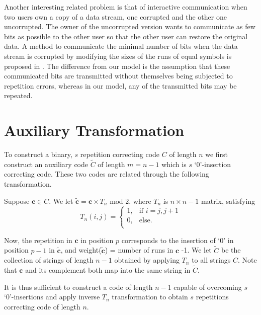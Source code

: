 Another interesting related problem is that of interactive
communication when two users own a copy of a data stream, one
corrupted and the other one uncorrupted. The owner of the
uncorrupted version wants to communicate as few bits as possible
to the other user so that the other user can restore the original
data. A method to communicate the minimal number of bits when the
data stream is corrupted by modifying the sizes of the runs of
equal symbols is proposed in \cite{orlitsky:93}. The difference
from our model is the assumption that these communicated bits are
transmitted without themselves being subjected to repetition
errors, whereas in our model, any of the transmitted bits may be
repeated.



\section{Auxiliary Transformation}\label{aux2}


To construct a binary, $s$ repetition correcting code $C$ of
length $n$ we first construct an auxiliary code $\tilde{C}$ of
length $m=n-1$ which is $s$ `0'-insertion correcting code. These
two codes are related through the following transformation.


Suppose $\mathbf{c} \in C$. We let $\mathbf{\tilde{c}}= \mathbf{c}
\times T_n \text{ mod } 2$, where $T_n$ is $n \times n-1$ matrix,
satisfying\vspace{-0.0in}\begin{equation}\label{eq:t}T_{n}(i,j)=\left\{
\begin{array}{lll}
    1, & \text{if }i = j,j+1\\
    0, & \text{else.} \\
\end{array} \right. \end{equation}


Now, the repetition in $\mathbf{c}$ in position $p$ corresponds to
the insertion of `0' in position $p-1$ in $\mathbf{\tilde{c}}$,
and weight($\mathbf{\tilde{c}}$) = number of runs in $\mathbf{c}$
-1. We let $\tilde{C}$ be the collection of strings of length
$n-1$ obtained by applying $T_n$ to all strings $C$. Note that
$\mathbf{c}$ and its complement both map into the same string in
$\tilde{C}$.

It is thus sufficient to construct a code of length $n-1$ capable
of overcoming $s$ `0'-insertions and apply inverse $T_n$
transformation to obtain $s$ repetitions correcting code of length
$n$.
